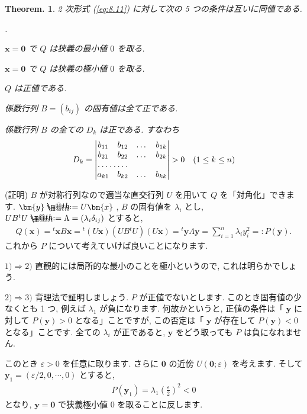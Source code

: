 \documentclass[openany, a4paper, oneside]{jsbook}
\makeatletter
\newcounter{enum2}
\renewenvironment{enumerate}{%
\begin{list}%
{%
\arabic{enum2}.\ \,%
}%
{%
\usecounter{enum2}
\setlength{\itemindent}{0pt}%
\setlength{\leftmargin}{15pt}%
\setlength{\rightmargin}{0pt}%
\setlength{\labelsep}{0pt}%
\setlength{\labelwidth}{6pt}%
\setlength{\itemsep}{0pt}%
\setlength{\parsep}{0pt}%
\setlength{\listparindent}{0pt}%
}
}{%
\end{list}%
}
\newcommand*{\defeq}{\mathrel{\rlap{%
\raisebox{0.3ex}{$\m@th\cdot$}}%
\raisebox{-0.3ex}{$\m@th\cdot$}}%
=}
\theoremstyle{break}
\theoremstyle{breakdefn}
\newtheorem{thm}{Theorem.}[section]
\newcommand{\vep}{\varepsilon}
\makeatother
\begin{document}
\begin{thm}
2 次形式 (\ref{eq:8.11}) に対して次の 5 つの条件は互いに同値である.
\begin{enumerate}
\item[1)] $\bm{x} = \bm{0}$ で $Q$ は狭義の最小値 $0$ を取る.
\item[2)] $\bm{x} = \bm{0}$ で $Q$ は狭義の極小値 $0$ を取る.
\item[3)] $Q$ は正値である.
\item[4)] 係数行列 $B = (b_{ij})$ の固有値は全て正である.
\item[5)] 係数行列 $B$ の全ての $D_k$ は正である. すなわち
\begin{align}
D_k
=
\begin{vmatrix}
b_{11} & b_{12} & \dots & b_{1k} \\
b_{21} & b_{22} & \dots & b_{2k} \\
\hdotsfor{2} \\
a_{k1} & b_{k2} & \dots & b_{k k}
\end{vmatrix}
>
0 \quad (1 \leq k \leq n )
\end{align}
\end{enumerate}
\end{thm}
(証明)
$B$ が対称行列なので適当な直交行列 $U$ を用いて $Q$ を「対角化」できます.
$\bm{y} \defeq U\bm{x}$ ,
$B$ の固有値を $\lambda_i$ とし,
$U B {^t} U \defeq \Lambda = ( \lambda_i \delta_{ij} )$ とすると,
\begin{align}
Q ( \bm{x} )
=
{^t} \bm{x} B \bm{x}
=
{^t} ( U \bm{x} ) ( U B {^t} U ) ( U \bm{x} )
=
{^t} \bm{y} \Lambda \bm{y}
=
\sum_{i=1}^n \lambda_i y_i^2
=:
P ( \bm{y} ).
\end{align}
これから $P$ について考えていけば良いことになります.

$1)\Rightarrow 2)$
直観的には局所的な最小のことを極小というので, これは明らかでしょう.

$2)\Rightarrow 3)$
背理法で証明しましょう.
$P$ が正値でないとします. このとき固有値の少なくとも 1 つ, 例えば $\lambda_1$ が負になります.
何故かというと, 正値の条件は「 $\bm{y}$ に対して $P (\bm{y})>0$ となる」ことですが,
この否定は「 $\bm{y}$ が存在して $P (\bm{y})<0$ となる」ことです.
全ての $\lambda_i$ が正であると,  $\bm{y}$ をどう取っても $P$ は負になれません.

このとき $\vep>0$ を任意に取ります. さらに $\bm{0}$ の近傍 $U (\bm{0};\vep)$ を考えます.
そして $\bm{y}_1 = ( \vep/2 , 0 , \dotsb , 0 )$ とすると,
\begin{align}
P ( \bm{y}_1 )
=
\lambda_1  \left ( \frac{\vep} {2} \right) ^2
<
0
\end{align}
となり,  $\bm{y}=\bm{0}$ で狭義極小値 $0$ を取ることに反します.
\end{document}

